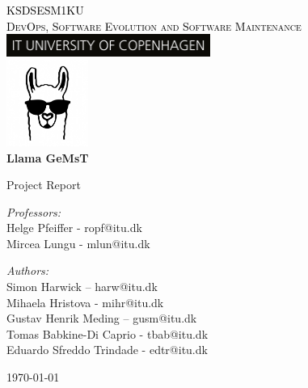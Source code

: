 \documentclass{article}
\begin{document}
\begin{titlepage}



\begin{center}

\sffamily
\textsc{\Huge\textcolor{black}{KSDSESM1KU}}\\[0.5cm]
\sffamily\textsc{\small{\textcolor{black}{DevOps, Software Evolution and Software Maintenance}}}\\[4cm]


\includegraphics[width=0.5\textwidth]{images/ITU_logo_UK.jpg}~\\[3cm]

\includegraphics[width=0.2\textwidth]{images/llama.png}~\\[0.1cm]

{
 \huge \bfseries \sffamily Llama GeMsT \\[0.4cm] 
}

\normalfont \large \sffamily Project Report \\[2.5cm]


\noindent
\begin{minipage}{0.5\textwidth} %
\begin{flushleft} \large
\emph{Professors:} \\
Helge Pfeiffer - ropf@itu.dk \\
Mircea Lungu - mlun@itu.dk\\
\end{flushleft}
\end{minipage}%
\begin{minipage}{0.5\textwidth} %
\begin{flushright} \large
\emph{Authors:}\\
Simon Harwick – harw@itu.dk\\
Mihaela Hristova - mihr@itu.dk \\
Gustav Henrik Meding – gusm@itu.dk\\
Tomas Babkine-Di Caprio - tbab@itu.dk \\
Eduardo Sfreddo Trindade - edtr@itu.dk\\
\end{flushright}
\end{minipage}

\vfill

\vfill
\vfill
{\large \today}

\end{center}
\end{titlepage}
\end{document}
